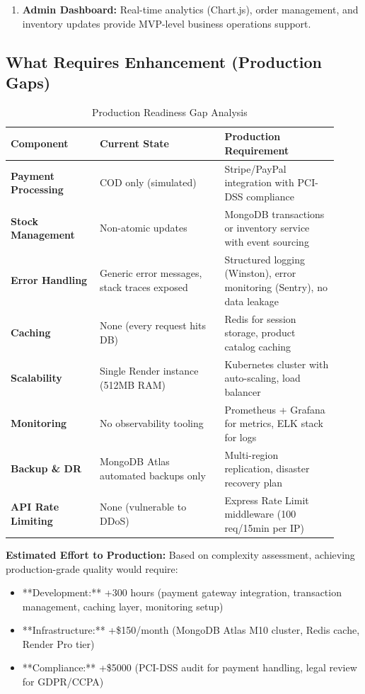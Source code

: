 \documentclass[12pt, a4paper]{report}
\begin{document}
{{\begin{enumerate}
    \item \textbf{Admin Dashboard:} Real-time analytics (Chart.js), order management, and inventory updates provide MVP-level business operations support.
\end{enumerate}

\subsection{What Requires Enhancement (Production Gaps)}

\begin{table}[H]
\centering
\caption{Production Readiness Gap Analysis}
\label{tab:production_gaps}
\small
\begin{tabular}{@{}p{0.25\linewidth}p{0.35\linewidth}p{0.32\linewidth}@{}}
\toprule
\textbf{Component} & \textbf{Current State} & \textbf{Production Requirement} \\
\midrule
\textbf{Payment Processing} & COD only (simulated) & Stripe/PayPal integration with PCI-DSS compliance \\
\textbf{Stock Management} & Non-atomic updates & MongoDB transactions or inventory service with event sourcing \\
\textbf{Error Handling} & Generic error messages, stack traces exposed & Structured logging (Winston), error monitoring (Sentry), no data leakage \\
\textbf{Caching} & None (every request hits DB) & Redis for session storage, product catalog caching \\
\textbf{Scalability} & Single Render instance (512MB RAM) & Kubernetes cluster with auto-scaling, load balancer \\
\textbf{Monitoring} & No observability tooling & Prometheus + Grafana for metrics, ELK stack for logs \\
\textbf{Backup \& DR} & MongoDB Atlas automated backups only & Multi-region replication, disaster recovery plan \\
\textbf{API Rate Limiting} & None (vulnerable to DDoS) & Express Rate Limit middleware (100 req/15min per IP) \\
\bottomrule
\end{tabular}
\end{table}

\textbf{Estimated Effort to Production:} Based on complexity assessment, achieving production-grade quality would require:
\begin{itemize}
    \item **Development:** +300 hours (payment gateway integration, transaction management, caching layer, monitoring setup)
    \item **Infrastructure:** +\$150/month (MongoDB Atlas M10 cluster, Redis cache, Render Pro tier)
    \item **Compliance:** +\$5000 (PCI-DSS audit for payment handling, legal review for GDPR/CCPA) 
\end{itemize}



}}
\end{document}

